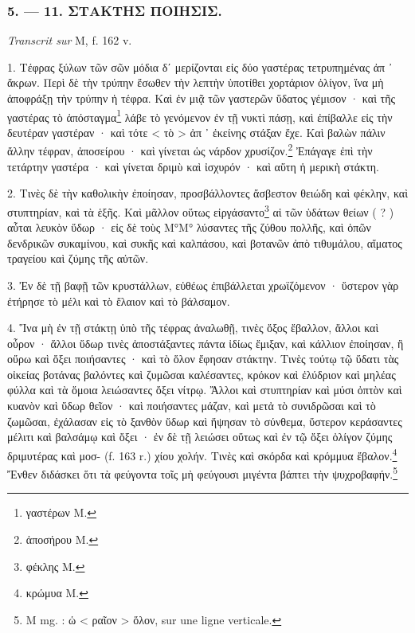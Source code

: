 \documentclass[a4paper, 11pt, oneside, polutonikogreek, french]{article}
\begin{document}
\bigskip
\centerline{\EightStarTaper}
\centerline{\EightStarTaper\EightStarTaper}
\bigskip

\subsubsection{5. --- 11. ΣΤΑΚΤΗΣ ΠΟΙΗΣΙΣ.}

\emph{Transcrit sur} M, f. 162 v.

\bigskip

1. Τέφρας ξύλων τῶν σῶν μόδια δʹ μερίζονται εἰς δύο γαστέρας τετρυπημένας ἀπ ᾽ ἄκρων. Περὶ δὲ τὴν τρύπην ἔσωθεν τὴν λεπτὴν ὑποτίθει χορτάριον ὀλίγον, ἵνα μὴ ἀποφράξῃ τὴν τρύπην ἡ τέφρα. Καὶ ἐν μιᾷ τῶν γαστερῶν ὕδατος γέμισον · καὶ τῆς γαστέρας τὸ ἀπόσταγμα\footnote{γαστέρων M.} λάβε τὸ γενόμενον ἐν τῇ νυκτὶ πάσῃ, καὶ ἐπίβαλλε εἰς τὴν δευτέραν γαστέραν · καὶ τότε < τὸ > ἀπ ᾽ ἐκείνης στάξαν ἔχε. Καὶ βαλὼν πάλιν ἄλλην τέφραν, ἀποσείρου · καὶ γίνεται ὡς νάρδον χρυσίζον.\footnote{ἀποσήρου M.} Ἐπάγαγε ἐπὶ τὴν τετάρτην γαστέρα · καὶ γίνεται δριμὺ καὶ ἰσχυρόν · καὶ αὕτη ἡ μερικὴ στάκτη.

2. Τινὲς δὲ τὴν καθολικὴν ἐποίησαν, προσβάλλοντες ἄσβεστον θειώδη καὶ φέκλην, καὶ στυπτηρίαν, καὶ τὰ ἑξῆς. Καὶ μᾶλλον οὕτως εἰργάσαντο\footnote{φέκλης M.} αἱ τῶν ὑδάτων θείων ( ? ) αὗται λευκὸν ὕδωρ · εἰς δὲ τοὺς Μ°Μ° λύσαντες τῆς ζύθου πολλῆς, καὶ ὁπῶν δενδρικῶν συκαμίνου, καὶ συκῆς καὶ καλπάσου, καὶ βοτανῶν ἀπὸ τιθυμάλου, αἵματος τραγείου καὶ ζύμης τῆς αὐτῶν.

3. Ἐν δὲ τῇ βαφῇ τῶν κρυστάλλων, εὐθέως ἐπιβάλλεται χρωϊζόμενον · ὕστερον γὰρ ἐτήρησε τὸ μέλι καὶ τὸ ἔλαιον καὶ τὸ βάλσαμον.

4. Ἵνα μὴ ἐν τῇ στάκτῃ ὑπὸ τῆς τέφρας ἀναλωθῇ, τινὲς ὄξος ἔβαλλον, ἄλλοι καὶ οὖρον · ἄλλοι ὕδωρ τινὲς ἀποστάξαντες πάντα ἰδίως ἔμιξαν, καὶ κάλλιον ἐποίησαν, ἢ οὔρω καὶ ὄξει ποιήσαντες · καὶ τὸ ὅλον ἔφησαν στάκτην. Τινὲς τούτῳ τῷ ὕδατι τὰς οἰκείας βοτάνας βαλόντες καὶ ζυμῶσαι καλέσαντες, κρόκον καὶ ἐλύδριον καὶ μηλέας φύλλα καὶ τὰ ὅμοια λειώσαντες ὄξει νίτρῳ. Ἄλλοι καὶ στυπτηρίαν καὶ μύσι ὀπτὸν καὶ κυανὸν καὶ ὕδωρ θεῖον · καὶ ποιήσαντες μάζαν, καὶ μετἀ τὸ συνιδρῶσαι καὶ τὸ ζωμῶσαι, ἐχάλασαν εἰς τὸ ξανθὸν ὕδωρ καὶ ἥψησαν τὸ σύνθεμα, ὕστερον κεράσαντες μέλιτι καὶ βαλσάμῳ καὶ ὄξει · ἐν δὲ τῇ λειώσει οὕτως καὶ ἐν τῷ ὄξει ὀλίγον ζύμης δριμυτέρας καὶ μοσ- (f. 163 r.) χίου χολήν. Τινὲς καὶ σκόρδα καὶ κρόμμυα ἔβαλον.\footnote{κρώμυα M.} Ἔνθεν διδάσκει ὅτι τὰ φεύγοντα τοῖς μὴ φεύγουσι μιγέντα βάπτει τὴν ψυχροβαφήν.\footnote{M mg. : ὡ < ραῖον > ὅλον, sur une ligne verticale.}
\end{document}

